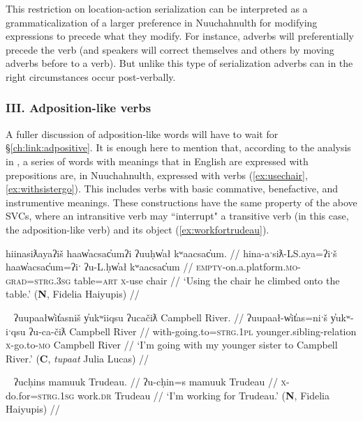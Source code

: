 This restriction on location-action serialization can be interpreted as a grammaticalization of a larger preference in Nuuchahnulth for modifying expressions to precede what they modify. For instance, adverbs will preferentially precede the verb (and speakers will correct themselves and others by moving adverbs before to a verb). But unlike this type of serialization adverbs can in the right circumstances occur post-verbally.

\vspace{10pt}

\subsubsection{III. Adposition-like verbs}

\vspace{10pt}

A fuller discussion of adposition-like words will have to wait for \S\ref{ch:link:adpositive}. It is enough here to mention that, according to the analysis in \citep{woo2007b}, a series of words with meanings that in English are expressed with prepositions are, in Nuuchahnulth, expressed with verbs (\ref{ex:usechair}, \ref{ex:withsistergo}). This includes verbs with basic commative, benefactive, and instrumentive meanings. These constructions have the same property of the above SVCs, where an intransitive verb may ``interrupt" a transitive verb (in this case, the adposition-like verb) and its object (\ref{ex:workfortrudeau}).


\ex \label{ex:usechair}
\begingl
\glpreamble hiinasiƛayaʔiš haaw̓acsac̓umʔi ʔuuḥw̓ał kʷaacsac̓um. //
\gla hina-aˑsiƛ-LS.aya=ʔiˑš haaw̓acsac̓um=ʔiˑ ʔu-L.ḥw̓ał kʷaacsac̓um //
\glb \textsc{empty}-on.a.platform.\textsc{mo}-\textsc{grad}=\textsc{strg.3sg} table=\textsc{art} \textsc{x}-use chair //
\glft `Using the chair he climbed onto the table.' (\textbf{N}, Fidelia Haiyupis) //
\endgl
\xe

\ex~ \label{ex:withsistergo}
\begingl
\glpreamble ʔuupaałw̓it̓asniš y̓ukʷiiqsu ʔucačiƛ Campbell River. //
\gla ʔuupaał-w̓it̓as=niˑš y̓ukʷ-iˑqsu ʔu-ca-čiƛ Campbell River //
\glb with-going.to=\textsc{strg.1pl} younger.sibling-relation \textsc{x}-go.to-\textsc{mo} Campbell River //
\glft `I'm going with my younger sister to Campbell River.' (\textbf{C}, \textit{tupaat} Julia Lucas) //
\endgl
\xe

\ex~ \label{ex:workfortrudeau}
\begingl
\glpreamble ʔucḥins mamuuk Trudeau. //
\gla ʔu-cḥin=s mamuuk Trudeau //
\glb \textsc{x}-do.for=\textsc{strg.1sg} work.\textsc{dr} Trudeau //
\glft `I'm working for Trudeau.' (\textbf{N}, Fidelia Haiyupis) //
\endgl
\xe

